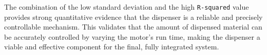 The combination of the low standard deviation and the high \texttt{R-squared} value provides strong quantitative evidence that the dispenser is a reliable and precisely controllable mechanism. This validates that the amount of dispensed material can be accurately controlled by varying the motor's run time, making the dispenser a viable and effective component for the final, fully integrated system.





